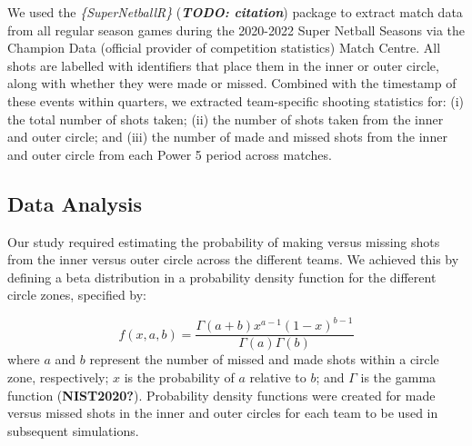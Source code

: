 \documentclass[]{elsarticle} %
\begin{document}
We used the \emph{\{SuperNetballR\}} (\textbf{\emph{TODO: citation}})
package to extract match data from all regular season games during the
2020-2022 Super Netball Seasons via the Champion Data (official provider
of competition statistics) Match Centre. All shots are labelled with
identifiers that place them in the inner or outer circle, along with
whether they were made or missed. Combined with the timestamp of these
events within quarters, we extracted team-specific shooting statistics
for: (i) the total number of shots taken; (ii) the number of shots taken
from the inner and outer circle; and (iii) the number of made and missed
shots from the inner and outer circle from each Power 5 period across
matches.

\hypertarget{data-analysis}{%
\subsection{Data Analysis}\label{data-analysis}}

Our study required estimating the probability of making versus missing
shots from the inner versus outer circle across the different teams. We
achieved this by defining a beta distribution in a probability density
function for the different circle zones, specified by:

\[f(x,a,b) = \frac{\Gamma(a+b)x^{a-1}(1-x)^{b-1}}{\Gamma(a)\Gamma(b)} \]
where \(a\) and \(b\) represent the number of missed and made shots
within a circle zone, respectively; \(x\) is the probability of \(a\)
relative to \(b\); and \(\Gamma\) is the gamma function
(\textbf{NIST2020?}). Probability density functions were created for
made versus missed shots in the inner and outer circles for each team to
be used in subsequent simulations.
\end{document}
